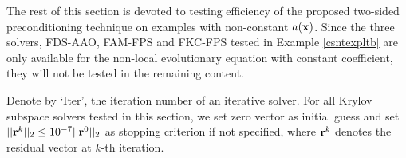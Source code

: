 \documentclass[11pt]{article}%
\numberwithin{equation}{section}
\begin{document}
The rest of this section is devoted to testing efficiency of the proposed two-sided preconditioning technique on examples with non-constant $a({\bf x})$. Since the three solvers, FDS-AAO, FAM-FPS and FKC-FPS tested in Example \ref{csntexpltb} are only available for the non-local evolutionary equation with constant coefficient, they will not be tested in the remaining content.
%


Denote by `Iter', the iteration number of an iterative solver. For all Krylov subspace solvers tested in this section, we set zero vector as initial guess and set $||{\bf r}^k||_2\leq 10^{-7}||{\bf r}^0||_2$ as stopping criterion if not specified, where ${\bf r}^k$ denotes the residual vector at $k$-th iteration.
\end{document}
